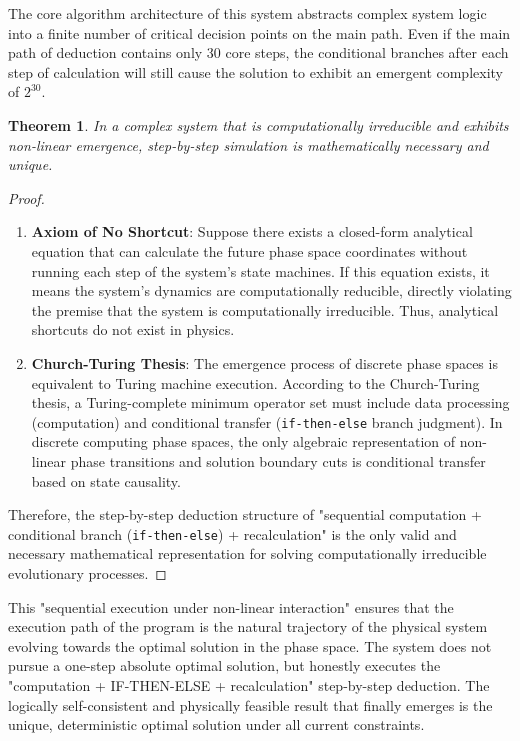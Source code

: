 \documentclass[11pt,a4paper]{article}
\newtheorem{theorem}{Theorem}[section]
\begin{document}
The core algorithm architecture of this system abstracts complex system logic into a finite number of critical decision points on the main path. Even if the main path of deduction contains only 30 core steps, the conditional branches after each step of calculation will still cause the solution to exhibit an emergent complexity of $2^{30}$.

\begin{theorem}
In a complex system that is computationally irreducible and exhibits non-linear emergence, step-by-step simulation is mathematically necessary and unique.
\end{theorem}
\begin{proof}
\begin{enumerate}
    \item \textbf{Axiom of No Shortcut}: Suppose there exists a closed-form analytical equation that can calculate the future phase space coordinates without running each step of the system's state machines. If this equation exists, it means the system's dynamics are computationally reducible, directly violating the premise that the system is computationally irreducible. Thus, analytical shortcuts do not exist in physics.
    \item \textbf{Church-Turing Thesis}: The emergence process of discrete phase spaces is equivalent to Turing machine execution. According to the Church-Turing thesis, a Turing-complete minimum operator set must include data processing (computation) and conditional transfer (\texttt{if-then-else} branch judgment). In discrete computing phase spaces, the only algebraic representation of non-linear phase transitions and solution boundary cuts is conditional transfer based on state causality.
\end{enumerate}
Therefore, the step-by-step deduction structure of "sequential computation + conditional branch (\texttt{if-then-else}) + recalculation" is the only valid and necessary mathematical representation for solving computationally irreducible evolutionary processes.
\end{proof}

This "sequential execution under non-linear interaction" ensures that the execution path of the program is the natural trajectory of the physical system evolving towards the optimal solution in the phase space. The system does not pursue a one-step absolute optimal solution, but honestly executes the "computation + IF-THEN-ELSE + recalculation" step-by-step deduction. The logically self-consistent and physically feasible result that finally emerges is the unique, deterministic optimal solution under all current constraints.
\end{document}

